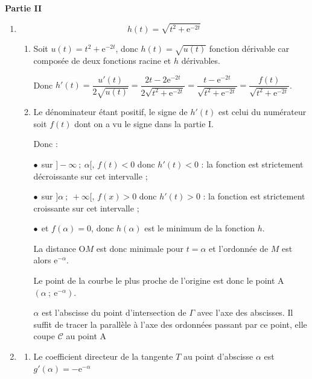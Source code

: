 \documentclass[10pt]{article}
\begin{document}
\begin{center}\textbf{Partie II}\end{center}














\begin{enumerate}
\item 





\[h(t) = \sqrt{t^2 + \text{e}^{-2t}}\]

	\begin{enumerate}
		\item 
Soit $u(t) = t^2 + \text{e}^{-2t}$, donc $h(t) = \sqrt{u(t)}$ fonction dérivable car composée de deux fonctions \og racine \fg{}  et $h$ dérivables.

Donc $h'(t) = \dfrac{u'(t)}{2\sqrt{u(t)}} = \dfrac{2t - 2\text{e}^{-2t}}{2\sqrt{t^2 + \text{e}^{-2t}}} = \dfrac{t - \text{e}^{-2t}}{\sqrt{t^2 + \text{e}^{-2t}}} = \dfrac{f(t)}{\sqrt{t^2 + \text{e}^{-2t}}}$.



		\item 
		
Le dénominateur étant positif, le signe de $h'(t)$ est celui du numérateur soit $f(t)$ dont on a vu le signe dans la partie I.

Donc :

$\bullet~~$sur $]- \infty~;~\alpha[, \, f(t) < 0$ donc $h'(t) < 0$ : la fonction est strictement décroissante sur cet intervalle ;

$\bullet~~$sur $]\alpha~;~+ \infty[, \, f(x) > 0$ donc $h'(t) > 0$ : la fonction est strictement croissante sur cet intervalle ;

$\bullet~~$et $f(\alpha) = 0$, donc $h(\alpha)$ est le minimum de la fonction $h$.

La distance O$M$ est donc minimale pour $t = \alpha$ et l'ordonnée de $M$ est alors $\text{e}^{- \alpha}$.

Le point de la courbe le plus proche de l'origine est donc le point A$\left(\alpha~;~\text{e}^{-\alpha}\right)$.


$\alpha$ est l'abscisse du point d'intersection de $\Gamma$ avec l'axe des abscisses. Il suffit de tracer la parallèle à l'axe des ordonnées passant par ce point, elle coupe $\mathcal{C}$ au point A
	\end{enumerate}
\item 
	\begin{enumerate}
		\item 
Le coefficient directeur de la tangente $T$ au point d'abscisse $\alpha$ est $g'(\alpha) = - \text{e}^{- \alpha}$		







\end{enumerate}
\end{enumerate}
\end{document}
